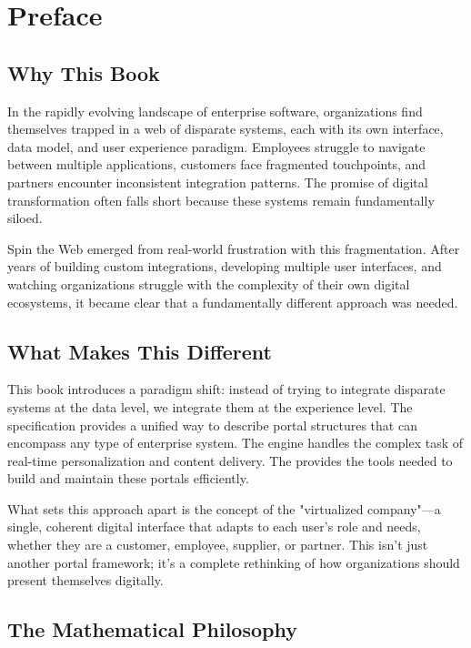 
\chapter*{Preface}

\section*{Why This Book}

In the rapidly evolving landscape of enterprise software, organizations find themselves trapped in a web of disparate systems, each with its own interface, data model, and user experience paradigm. Employees struggle to navigate between multiple applications, customers face fragmented touchpoints, and partners encounter inconsistent integration patterns. The promise of digital transformation often falls short because these systems remain fundamentally siloed.

Spin the Web emerged from real-world frustration with this fragmentation. After years of building custom integrations, developing multiple user interfaces, and watching organizations struggle with the complexity of their own digital ecosystems, it became clear that a fundamentally different approach was needed.

\section*{What Makes This Different}

This book introduces a paradigm shift: instead of trying to integrate disparate systems at the data level, we integrate them at the experience level. The \wbdl specification provides a unified way to describe portal structures that can encompass any type of enterprise system. The \webspinner engine handles the complex task of real-time personalization and content delivery. The \studio provides the tools needed to build and maintain these portals efficiently.

What sets this approach apart is the concept of the "virtualized company"—a single, coherent digital interface that adapts to each user's role and needs, whether they are a customer, employee, supplier, or partner. This isn't just another portal framework; it's a complete rethinking of how organizations should present themselves digitally.

\section*{The Mathematical Philosophy}

